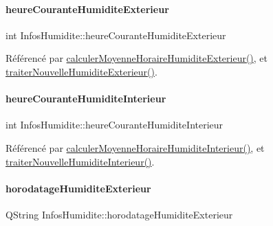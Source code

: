 \paragraph{\texorpdfstring{heure\+Courante\+Humidite\+Exterieur}{heureCouranteHumiditeExterieur}}
{\footnotesize\ttfamily int Infos\+Humidite\+::heure\+Courante\+Humidite\+Exterieur\hspace{0.3cm}{\ttfamily [private]}}



Référencé par \hyperlink{class_infos_humidite_afc4f6ba3cd4664118ef40f4c12b76506}{calculer\+Moyenne\+Horaire\+Humidite\+Exterieur()}, et \hyperlink{class_infos_humidite_a8d17fa3c7d15b1ff8130ae5d22702e5f}{traiter\+Nouvelle\+Humidite\+Exterieur()}.

\mbox{\label{class_infos_humidite_a5a8597751ba0fe10a14a12e155421485}} 
\paragraph{\texorpdfstring{heure\+Courante\+Humidite\+Interieur}{heureCouranteHumiditeInterieur}}
{\footnotesize\ttfamily int Infos\+Humidite\+::heure\+Courante\+Humidite\+Interieur\hspace{0.3cm}{\ttfamily [private]}}



Référencé par \hyperlink{class_infos_humidite_acd903311f6c949f8f010b330f517e4f3}{calculer\+Moyenne\+Horaire\+Humidite\+Interieur()}, et \hyperlink{class_infos_humidite_a0995d68a036f73df3b5a86e5538104bd}{traiter\+Nouvelle\+Humidite\+Interieur()}.

\mbox{\label{class_infos_humidite_aa08b4f342e83f8ad437a8272698bb512}} 
\paragraph{\texorpdfstring{horodatage\+Humidite\+Exterieur}{horodatageHumiditeExterieur}}
{\footnotesize\ttfamily Q\+String Infos\+Humidite\+::horodatage\+Humidite\+Exterieur\hspace{0.3cm}{\ttfamily [private]}}




